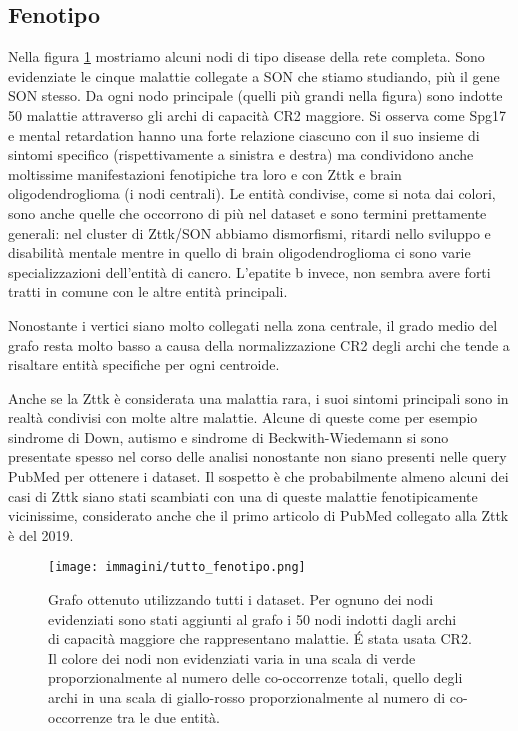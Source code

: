 \documentclass[12pt]{report}
\begin{document}
\subsection{Fenotipo}

Nella figura \ref{fig:tutto_fenotipo} mostriamo alcuni nodi di tipo disease della rete completa. Sono evidenziate le cinque malattie collegate a SON che stiamo studiando, più il gene SON stesso. Da ogni nodo principale (quelli più grandi nella figura) sono indotte 50 malattie attraverso gli archi di capacità CR2 maggiore. Si osserva come Spg17 e mental retardation hanno una forte relazione ciascuno con il suo insieme di sintomi specifico (rispettivamente a sinistra e destra) ma condividono anche moltissime manifestazioni fenotipiche tra loro e con Zttk e brain oligodendroglioma (i nodi centrali). Le entità condivise, come si nota dai colori, sono anche quelle che occorrono di più nel dataset e sono termini prettamente generali: nel cluster di Zttk/SON abbiamo dismorfismi, ritardi nello sviluppo e disabilità mentale mentre in quello di brain oligodendroglioma ci sono varie specializzazioni dell'entità di cancro. L'epatite b invece, non sembra avere forti tratti in comune con le altre entità principali. 

Nonostante i vertici siano molto collegati nella zona centrale, il grado medio del grafo resta molto basso a causa della normalizzazione CR2 degli archi che tende a risaltare entità specifiche per ogni centroide.

Anche se la Zttk è considerata una malattia rara, i suoi sintomi principali sono in realtà condivisi con molte altre malattie. Alcune di queste come per esempio sindrome di Down, autismo e sindrome di Beckwith-Wiedemann si sono presentate spesso nel corso delle analisi nonostante non siano presenti nelle query PubMed per ottenere i dataset. Il sospetto è che probabilmente almeno alcuni dei casi di Zttk siano stati scambiati con una di queste malattie fenotipicamente vicinissime, considerato anche che il primo articolo di PubMed collegato alla Zttk è del 2019.

\begin{figure}[!htb]
\centering
\texttt{[image: immagini/tutto\_fenotipo.png]}
\caption{\footnotesize{Grafo ottenuto utilizzando tutti i dataset. Per ognuno dei nodi evidenziati sono stati aggiunti al grafo i 50 nodi indotti dagli archi di capacità maggiore che rappresentano malattie. \'E stata usata CR2. Il colore dei nodi non evidenziati varia in una scala di verde proporzionalmente al numero delle co-occorrenze totali, quello degli archi in una scala di giallo-rosso proporzionalmente al numero di co-occorrenze tra le due entità.}}
\label{fig:tutto_fenotipo}
\end{figure}
\end{document}
